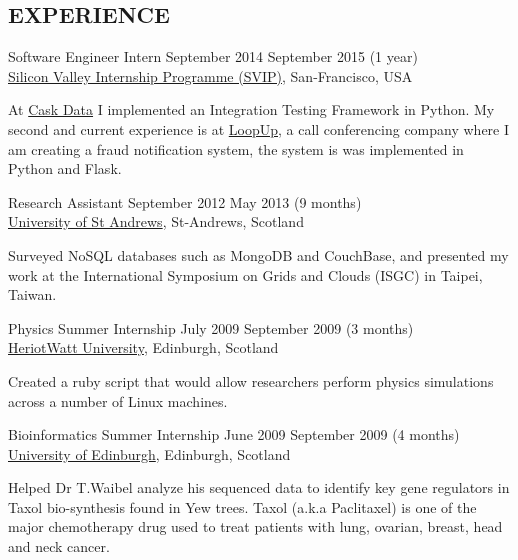\documentclass[line,margin]{cv}
\begin{document}
\begin{resume}
\section{EXPERIENCE}

Software Engineer Intern
\hfill September 2014 \textemdash{} September 2015 (1 year) \\
\href{http://www.siliconvalleyinternship.com/}
{Silicon Valley Internship Programme (SVIP)}, San-Francisco, USA

\vspace{0.1em}
\begin{adjustwidth}{2.0em}{2.0em}
    At \href{http://cask.io}{Cask Data} I implemented an Integration Testing 
    Framework in Python. My second and current experience is at 
    \href{http://loopup.com}{LoopUp}, a call conferencing
    company where I am creating a fraud notification system, the system is
    was implemented in Python and Flask.
\end{adjustwidth}


Research Assistant
\hfill September 2012 \textemdash{}  May 2013 (9 months) \\
\href{http://www.st-andrews.ac.uk}{University of St Andrews}, St-Andrews, Scotland

\vspace{0.1em}
\begin{adjustwidth}{2.0em}{2.0em}
    Surveyed NoSQL databases such as MongoDB and CouchBase, and presented 
    my work at the International Symposium on Grids and Clouds (ISGC) 
    in Taipei, Taiwan.
\end{adjustwidth}


Physics Summer Internship
\hfill July 2009 \textemdash{} September 2009 (3 months) \\
\href{http://www.hw.ac.uk}{Heriot­Watt University}, Edinburgh, Scotland

\vspace{0.1em}
\begin{adjustwidth}{2.0em}{2.0em}
    Created a ruby script that would allow researchers perform
    physics simulations across a number of Linux machines.
\end{adjustwidth}


\pagebreak
Bioinformatics Summer Internship
\hfill June 2009 \textemdash{} September 2009 (4 months) \\
\href{http://www.ed.ac.uk}{University of Edinburgh}, Edinburgh, Scotland

\vspace{0.1em}
\begin{adjustwidth}{2.0em}{2.0em}
    Helped Dr T.Waibel analyze his sequenced data to identify key gene regulators
    in Taxol bio-synthesis found in Yew trees. Taxol (a.k.a Paclitaxel) is 
    one of the major chemotherapy drug used to treat patients with lung, 
    ovarian, breast, head and neck cancer.
\end{adjustwidth}



\end{resume}
\end{document}
